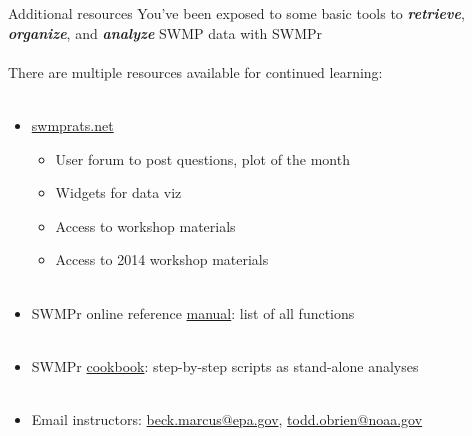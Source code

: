 \documentclass[xcolor=dvipsnames,serif]{beamer}\usepackage[]{graphicx}\usepackage[]{color}
\newcommand{\Bigtxt}[1]{\textbf{\textit{#1}}}
\begin{document}
\begin{frame}{Additional resources}
You've been exposed to some basic tools to \Bigtxt{retrieve}, \Bigtxt{organize}, and \Bigtxt{analyze} SWMP data with SWMPr \\~\\
There are multiple resources available for continued learning: \\~\\
\begin{itemize}
\item \href{http://swmprats.net/}{swmprats.net}
\begin{itemize}
\item User forum to post questions, plot of the month
\item Widgets for data viz
\item Access to workshop materials
\item Access to 2014 workshop materials \\~\\
\end{itemize}
\item SWMPr online reference \href{https://cran.r-project.org/web/packages/SWMPr/SWMPr.pdf}{manual}: list of all functions \\~\\
\item SWMPr \href{https://github.com/fawda123/swmp_workshop_2015/raw/master/cookbook/swmpr_cookbook.pdf}{cookbook}: step-by-step scripts as stand-alone analyses \\~\\
\item Email instructors: \href{mailto:beck.marcus@epa.gov}{beck.marcus@epa.gov}, \href{todd.obrien@noaa.gov}{todd.obrien@noaa.gov}
\end{itemize}
\end{frame}

\end{document}
